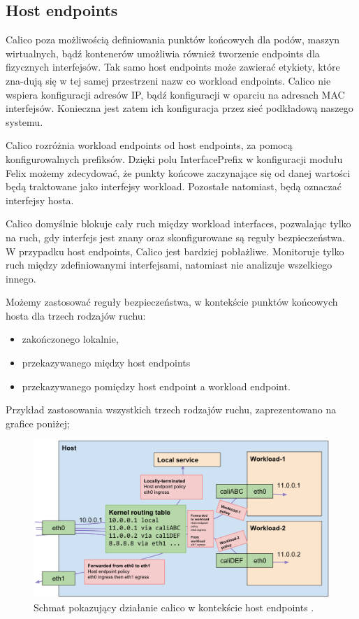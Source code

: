 \documentclass[pl,final,oneside]{mgr} %
\begin{document}
\subsection{Host endpoints}
Calico poza możliwością definiowania punktów końcowych dla podów, maszyn wirtualnych, bądź kontenerów umożliwia również tworzenie endpoints dla fizycznych interfejsów. Tak samo host endpoints może zawierać etykiety, które zna-dują się w tej samej przestrzeni nazw co workload endpoints. Calico nie wspiera konfiguracji adresów IP, bądź konfiguracji w oparciu na adresach MAC interfejsów. Konieczna jest zatem ich konfiguracja przez sieć podkładową naszego systemu.

Calico rozróżnia workload endpoints od host endpoints, za pomocą konfigurowalnych prefiksów. Dzięki polu InterfacePrefix w konfiguracji modułu Felix możemy zdecydować, że punkty końcowe zaczynające się od danej wartości będą traktowane jako interfejsy workload. Pozostałe natomiast, będą oznaczać interfejsy hosta.

Calico domyślnie blokuje cały ruch między workload interfaces, pozwalając tylko na ruch, gdy interfejs jest znany oraz skonfigurowane są reguły bezpieczeństwa. W przypadku host endpoints, Calico jest bardziej pobłażliwe. Monitoruje tylko ruch między zdefiniowanymi interfejsami, natomiast nie analizuje wszelkiego innego.

Możemy zastosować reguły bezpieczeństwa, w kontekście punktów końcowych hosta dla trzech rodzajów ruchu:
\begin{itemize}
	\item zakończonego lokalnie,
	\item przekazywanego między host endpoints
	\item przekazywanego pomiędzy host endpoint a workload endpoint.
\end{itemize}
Przykład zastosowania wszystkich trzech rodzajów ruchu, zaprezentowano na grafice poniżej;

\begin{figure}[h!]
	\centering
	\includegraphics[width=1\linewidth]{images/bare-metal-packet-flows}
	\caption{Schmat pokazujący działanie calico w kontekście host endpoints \cite{calico_doku}.}
	\label{fig:bare-metal-packet-flows}
\end{figure}
\end{document}
